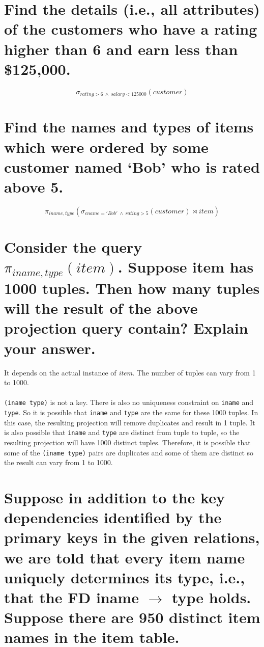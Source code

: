 \documentclass{article}
\begin{document}
\section{Find the details (i.e., all attributes) of the customers who have a rating higher than 6 and earn less than \$125,000.}
\[
\sigma_{rating > 6 \  \wedge \ salary < 125000}(customer)
\]

\section{Find the names and types of items which were ordered by some customer named `Bob' who is rated above 5.}
\[
\pi_{iname, type}(\sigma_{cname='Bob' \ \wedge \ rating > 5}(customer) \bowtie item)
\]

\section{Consider the query \(\pi_{iname,type}(item)\). Suppose item has 1000 tuples. Then how many tuples
will the result of the above projection query contain? Explain your answer.}

It depends on the actual instance of \textit{item}. The number of tuples can vary from 1 to 1000.\\
\\
\texttt{(iname type)} is not a key. There is also no uniqueness constraint on \texttt{iname} and \texttt{type}. So it is possible that \texttt{iname} and \texttt{type} are the same for these 1000 tuples. In this case, the resulting projection will remove duplicates and result in 1 tuple. It is also possible that \texttt{iname} and \texttt{type} are distinct from tuple to tuple, so the resulting projection will have 1000 distinct tuples. Therefore, it is possible that some of the \texttt{(iname type)} pairs are duplicates and some of them are distinct so the result can vary from 1 to 1000.


\section{Suppose in addition to the key dependencies identified by the primary keys in the given
relations, we are told that every item name uniquely determines its type, i.e., that the FD
iname \(\to\) type holds. Suppose there are 950 distinct item names in the item table.}
\end{document}
